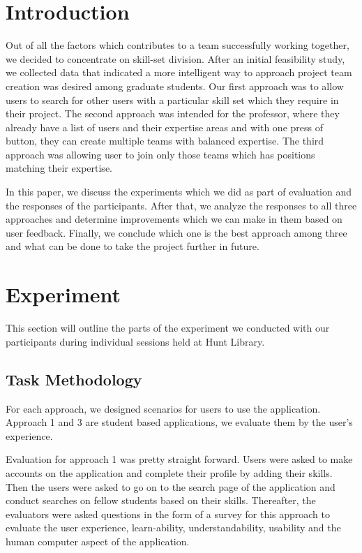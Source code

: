 \documentclass[conference]{IEEEtran}
\begin{document}
\section{Introduction}
Out of all the factors which contributes to a team successfully working together, we decided to concentrate on skill-set division. After an initial feasibility study, we collected data that indicated a more intelligent way to approach project team creation was desired among graduate students. Our first approach was to allow users to search for other users with a particular skill set which they require in their project. The second approach was intended for the professor, where they already have a list of users and their expertise areas and with one press of button, they can create multiple teams with balanced expertise. The third approach was allowing user to join only those teams which has positions matching their expertise.

In this paper, we discuss the experiments which we did as part of evaluation and the responses of the participants. After that, we analyze the responses to all three approaches and determine improvements which we can make in them based on user feedback. Finally, we conclude which one is the best approach among three and what can be done to take the project further in future.

\section{Experiment}
This section will outline the parts of the experiment we conducted with our participants during individual sessions held at Hunt Library.

\subsection{Task Methodology}

For each approach, we designed scenarios for users to use the application. Approach 1 and 3 are student based applications, we evaluate them by the user's experience. 

Evaluation for approach 1 was pretty straight forward. Users were asked to make accounts on the application and complete their profile by adding their skills. Then the users were asked to go on to the search page of the application and conduct searches on fellow students based on their skills. Thereafter, the evaluators were asked questions in the form of a survey for this approach to evaluate the user experience, learn-ability, understandability, usability and the human computer aspect of the application.
\end{document}
